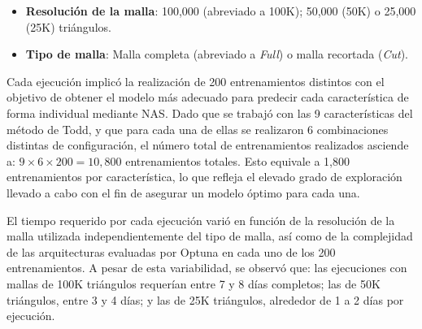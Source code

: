 \begin{itemize}
\item \textbf{Resolución de la malla}: 100,000 (abreviado a 100K); 50,000 (50K) o 25,000 (25K) triángulos.
\item \textbf{Tipo de malla}: Malla completa (abreviado a \textit{Full}) o malla recortada (\textit{Cut}).
\end{itemize}

Cada ejecución implicó la realización de 200 entrenamientos distintos con el objetivo de obtener el modelo más adecuado para predecir cada característica de forma individual mediante NAS. Dado que se trabajó con las 9 características del método de Todd, y que para cada una de ellas se realizaron 6 combinaciones distintas de configuración, el número total de entrenamientos realizados asciende a: $9\times6\times200=10,800$ entrenamientos totales. Esto equivale a 1,800 entrenamientos por característica, lo que refleja el elevado grado de exploración llevado a cabo con el fin de asegurar un modelo óptimo para cada una.

El tiempo requerido por cada ejecución varió en función de la resolución de la malla utilizada independientemente del tipo de malla, así como de la complejidad de las arquitecturas evaluadas por Optuna en cada uno de los 200 entrenamientos. A pesar de esta variabilidad, se observó que: las ejecuciones con mallas de 100K triángulos requerían entre 7 y 8 días completos; las de 50K triángulos, entre 3 y 4 días; y las de 25K triángulos, alrededor de 1 a 2 días por ejecución.


